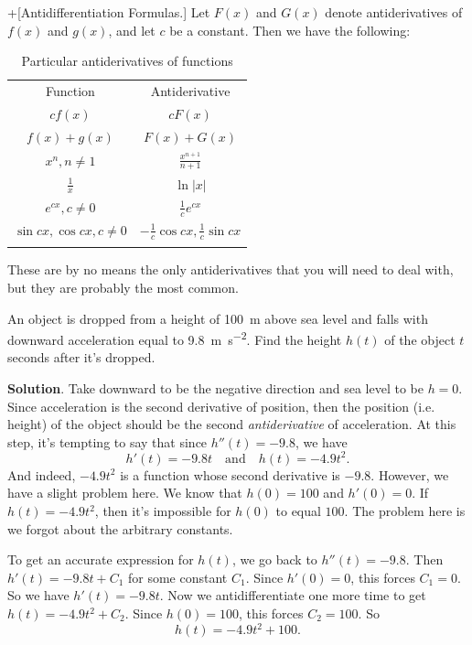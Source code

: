 \documentclass[10pt,]{book}
\theoremstyle{ptxplainnotitle}
\theoremstyle{ptxplaintitle}
\theoremstyle{ptxplainnotitle}
\theoremstyle{ptxplaintitle}
\theoremstyle{ptxplainnotitle}
\theoremstyle{ptxplaintitle}
\theoremstyle{ptxdefinitionnotitle}
\theoremstyle{ptxdefinitiontitle}
\theoremstyle{ptxdefinitionnotitle}
\theoremstyle{ptxdefinitiontitle}
\theoremstyle{ptxdefinitionnotitle}
\theoremstyle{ptxdefinitiontitle}
\theoremstyle{ptxdefinitionnotitle}
\theoremstyle{ptxdefinitiontitle}
\theoremstyle{ptxdefinitionnotitle}
\theoremstyle{ptxdefinitiontitle}
\numberwithin{equation}{section}
\newcommand{\hrulethin}  {\noalign{\hrule height 0.04em}}
\newcommand{\hrulethick} {\noalign{\hrule height 0.11em}}
\begin{document}
\begin{theorem}+[{Antidifferentiation Formulas.}]\label{theorem-antidifferentiation-formulas}
\hypertarget{p-392}{}%
Let \(F(x)\) and \(G(x)\) denote antiderivatives of \(f(x)\) and \(g(x)\), and let \(c\) be a constant. Then we have the following: \begin{table}
\centering
\begin{tabular}{cc}\hrulethick
Function&Antiderivative\tabularnewline\hrulethin
\(cf(x)\)&\(cF(x)\)\tabularnewline[0pt]
\(f(x) + g(x)\)&\(F(x) + G(x)\)\tabularnewline[0pt]
\(x^{n}, n\neq1\)&\(\frac{x^{n+1}}{n+1}\)\tabularnewline[0pt]
\(\frac{1}{x}\)&\(\ln|x|\)\tabularnewline[0pt]
\(e^{cx}, c\neq0\)&\(\frac{1}{c}e^{cx}\)\tabularnewline[0pt]
\(\sin cx, \cos cx, c\neq 0\)&\(-\frac{1}{c}\cos cx, \frac{1}{c}\sin cx\)\tabularnewline\hrulethick
\end{tabular}
\caption{Particular antiderivatives of functions\label{table-antiderivatives}}
\end{table}
 These are by no means the only antiderivatives that you will need to deal with, but they are probably the most common.%
\end{theorem}
\begin{example}\label{example-falling-objects}
\hypertarget{p-393}{}%
An object is dropped from a height of \SI{100}{\meter} above sea level and falls with downward acceleration equal to \SI{9.8}{\meter\per\second\tothe{2}}. Find the height \(h(t)\) of the object \(t\) seconds after it's dropped.%
\par\smallskip%
\noindent\textbf{Solution}.\hypertarget{solution-88}{}\quad%
\hypertarget{p-394}{}%
Take downward to be the negative direction and sea level to be \(h=0\). Since acceleration is the second derivative of position, then the position (i.e. height) of the object should be the second \emph{antiderivative} of acceleration. At this step, it's tempting to say that since \(h''(t) = -9.8\), we have%
\begin{equation*}
h'(t) = -9.8t\quad\text{and}\quad h(t) = -4.9 t^{2}\text{.}
\end{equation*}
And indeed, \(-4.9t^{2}\) is a function whose second derivative is \(-9.8\). However, we have a slight problem here. We know that \(h(0) = 100\) and \(h'(0) = 0\). If \(h(t) = -4.9t^{2}\), then it's impossible for \(h(0)\) to equal \(100\). The problem here is we forgot about the arbitrary constants.%
\par
\hypertarget{p-395}{}%
To get an accurate expression for \(h(t)\), we go back to \(h''(t) = -9.8\). Then \(h'(t) = -9.8t+C_{1}\) for some constant \(C_{1}\). Since \(h'(0) = 0\), this forces \(C_{1} = 0\). So we have \(h'(t) = -9.8t\). Now we antidifferentiate one more time to get \(h(t) = -4.9t^{2} + C_{2}\). Since \(h(0) = 100\), this forces \(C_{2} = 100\). So%
\begin{equation*}
h(t) = -4.9t^{2} + 100\text{.}
\end{equation*}
%
\end{example}
\end{document}
